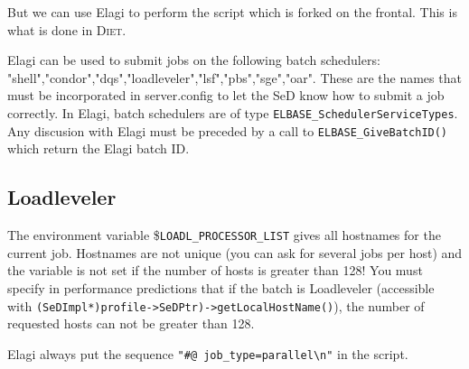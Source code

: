 But we can use Elagi to perform the script which is forked on the
frontal. This is what is done in \textsc{Diet}.

Elagi can be used to submit jobs on the following batch schedulers:
"shell","condor","dqs","loadleveler","lsf","pbs","sge","oar".
These are the names that must be incorporated in server.config to let
the SeD know how to submit a job correctly. In Elagi, batch schedulers
are of  type
\verb$ELBASE_SchedulerServiceTypes$. Any discusion with Elagi must be preceded by a call to \verb$ELBASE_GiveBatchID()$ which return the Elagi batch ID.

\subsection{Loadleveler}
The environment variable \$\verb$LOADL_PROCESSOR_LIST$ gives all hostnames
for the current job. Hostnames are not unique (you can ask for several
jobs per host) and the variable is not set if the number of hosts is
greater than 128!  You must {\huge specify} in performance predictions
that if the batch is Loadleveler (accessible with
\verb$(SeDImpl*)profile->SeDPtr)->getLocalHostName()$), the number of
requested hosts can not be greater than 128.

Elagi always put the sequence \verb$"#@ job_type=parallel\n"$ in the script.

